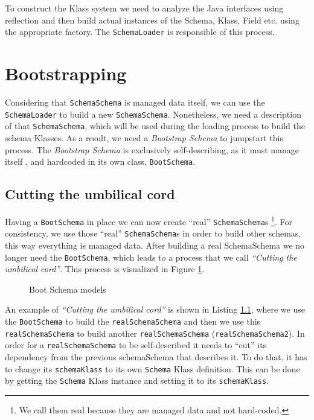 To construct the Klass system we need to analyze the Java interfaces using reflection and then build actual instances of the Schema, Klass, Field etc. using the appropriate factory.
The \texttt{SchemaLoader} is responsible of this process.

\section{Bootstrapping}\label{sec:Bootstrapping}
Considering that \texttt{SchemaSchema} is managed data itself, we can use the \texttt{SchemaLoader} to build a new \texttt{SchemaSchema}.
Nonetheless, we need a description of that \texttt{SchemaSchema}, which will be used during the loading process to build the schema Klasses.
As a result, we need a \textit{Bootstrap Schema} to jumpstart this process.
The \textit{Bootstrap Schema} is exclusively self-describing, as it must manage itself \cite{loh2012managed}, and hardcoded in its own class, \texttt{BootSchema}.

\subsection{Cutting the umbilical cord}\label{subsec:Cutting the umbilical cord}
Having a \texttt{BootSchema} in place we can now create ``real'' \texttt{SchemaSchema}s \footnote{
	We call them real because they are managed data and not hard-coded.}.
For consistency, we use those ``real'' \texttt{SchemaSchema}s in order to build other schemas, this way everything is managed data.
After building a real SchemaSchema we no longer need the \texttt{BootSchema}, which leads to a process that we call \textit{``Cutting the umbilical cord''}.
This process is visualized in Figure \ref{fig:schema_schema_models}.

\begin{figure}[H]
	\centering
  	\caption{Boot Schema models}
  	\label{fig:schema_schema_models}
\end{figure}

An example of \textit{``Cutting the umbilical cord''} is shown in Listing \ref{subsec:Cutting the umbilical cord}, where we use the \texttt{BootSchema} to build the \texttt{realSchemaSchema} and then we use this \texttt{realSchemaSchema} to build another \texttt{realSchemaSchema} (\texttt{realSchemaSchema2}).
In order for a \texttt{realSchemaSchema} to be self-described it needs to ``cut'' its dependency from the previous schemaSchema that describes it.
To do that, it has to change its \texttt{schemaKlass} to its own \texttt{Schema} Klass definition.
This can be done by getting the \texttt{Schema} Klass instance and setting it to its \texttt{schemaKlass}.

